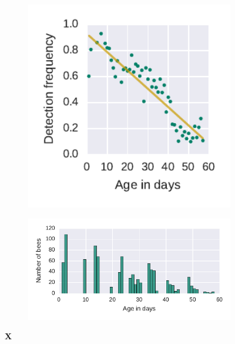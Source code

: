 \begin{figure}[htb]
	\centering
	\begin{subfigure}[b]{0.33\textwidth}
	\centering
	\includegraphics[width=1.0\textwidth]{Figures/n3_detFvsAge}
	\caption[]{}
	\label{fig:n3detfVSage}
	\end{subfigure} 
	\begin{subfigure}[b]{0.66\textwidth}
	\centering
	\includegraphics[width=1.0\textwidth]{Figures/n3_ages.pdf}
	\caption[]{}
	\label{fig:n3ageDist}
	\end{subfigure}
	\caption[X]{\textbf{X}}
	\label{fig:ageDetF}
\end{figure}